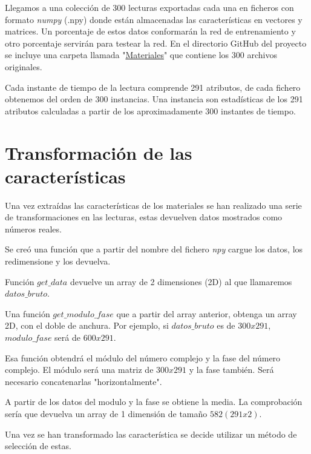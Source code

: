 Llegamos a una colección de 300 lecturas exportadas cada una en ficheros con formato \textit{numpy} (.npy) donde están almacenadas las características en vectores y matrices. Un porcentaje de estos datos conformarán la red de entrenamiento y otro porcentaje servirán para testear la red. En el directorio GitHub del proyecto se incluye una carpeta llamada "\href{https://github.com/mecyc/TFG_RADAR_60GHZ/tree/main/Materiales}{Materiales}" que contiene los 300 archivos originales.

Cada instante de tiempo de la lectura comprende 291 atributos, de cada fichero obtenemos del orden de 300 instancias. Una instancia son estadísticas de los 291 atributos calculadas a partir de los aproximadamente 300 instantes de tiempo.


\section{Transformación de las características}

Una vez extraídas las características de los materiales se han realizado una serie de transformaciones en las lecturas, estas devuelven datos mostrados como números reales.

Se creó una función que a partir del nombre del fichero \textit{npy} cargue los datos, los redimensione y los devuelva.

Función $get\_data$ devuelve un array de 2 dimensiones (2D) al que llamaremos $datos\_bruto$. 



Una función \textit{$get\_modulo\_fase$} que a partir del array anterior, obtenga un array 2D, con el doble de anchura. Por ejemplo, si \textit{$datos\_bruto$} es de $300 x 291$, $modulo\_fase$ será de $600 x 291$. 

Esa función obtendrá el módulo del número complejo y la fase del número complejo. El módulo será una matriz de $300 x 291$ y la fase también. Será necesario concatenarlas "horizontalmente". 



A partir de los datos del modulo y la fase se obtiene la media. La comprobación sería que devuelva un array de 1 dimensión de tamaño $582 (291 x 2)$.


Una vez se han transformado las característica se decide utilizar un método de selección de estas.

